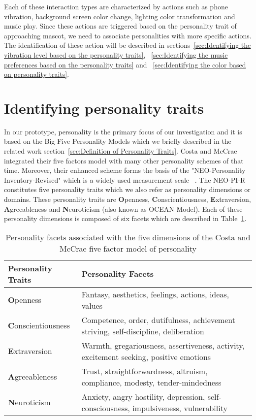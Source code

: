Each of these interaction types are characterized by actions such as phone vibration,
background screen color change, lighting color transformation and music play.
Since these actions are triggered based on the personality trait of approaching mascot,
we need to associate personalities with more specific actions.
The identification of these action will be described in
sections~\ref{sec:Identifying the vibration level based on the personality traits},
~\ref{sec:Identifying the music preferences based on the personality traits}
and ~\ref{sec:Identifying the color based on personality traits}.

\section{Identifying personality traits}
\label{sec:Identifying personality traits}

In our prototype, personality is the primary focus of our investigation and
it is based on the Big Five Personality Models which we briefly described
in the related work section~\ref{sec:Definition of Personality Traits}.
Costa and McCrae integrated their five factors model with many other personality schemes of that time.
Moreover, their enhanced scheme forms the basis of the "NEO-Personality Inventory-Revised"
which is a widely used measurement scale ~\cite{costa2008revised}.
The NEO-PI-R constitutes five personality traits which we also refer as personality dimensions or domains.
These personality traits are \textbf{O}penness, \textbf{C}onscientiousness,
\textbf{E}xtraversion, \textbf{A}greeableness and \textbf{N}euroticism (also known as  OCEAN Model).
Each of these personality dimensions is composed of six facets which are described in Table~\ref{table:personality}.

\begin{table} [h]
\centering
\begin{tabular}{ | m{8em} | m{25em}| }
\hline
\textbf{Personality Traits} & \textbf{Personality Facets}  \\
\hline
\textbf{O}penness & Fantasy, aesthetics, feelings, actions, ideas, values  \\
\hline 
\textbf{C}onscientiousness & Competence, order, dutifulness, achievement striving, self-discipline, deliberation  \\
\hline 
\textbf{E}xtraversion & Warmth, gregariousness, assertiveness, activity, excitement seeking, positive emotions \\
\hline 
\textbf{A}greeableness & Trust, straightforwardness, altruism, compliance, modesty, tender-mindedness  \\
\hline 
\textbf{N}euroticism & Anxiety, angry hostility, depression, self-consciousness, impulsiveness, vulnerability \\
\hline
\end{tabular}
\caption{Personality facets associated with the five dimensions of the Costa and McCrae five factor model of personality}
\label{table:personality}
\end{table}


